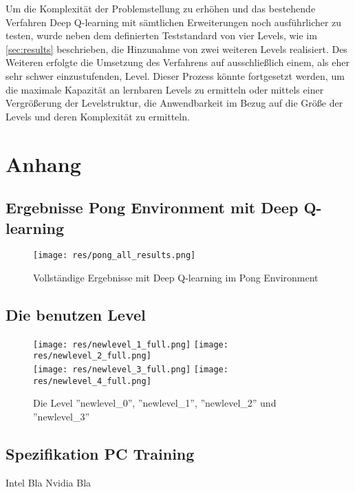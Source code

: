 \documentclass[11pt]{scrartcl}
\begin{document}
Um die Komplexität der Problemstellung zu erhöhen und das bestehende Verfahren Deep Q-learning mit
sämtlichen Erweiterungen noch ausführlicher zu testen, wurde neben dem definierten Teststandard von
vier Levels, wie im \autoref{sec:results} beschrieben, die Hinzunahme von zwei weiteren Levels
realisiert. Des Weiteren erfolgte die Umsetzung des Verfahrens auf ausschließlich einem, als eher
sehr schwer einzustufenden, Level. Dieser Prozess könnte fortgesetzt werden, um die maximale
Kapazität an lernbaren Levels zu ermitteln oder mittels einer Vergrößerung der Levelstruktur, die
Anwendbarkeit im Bezug auf die Größe der Levels und deren Komplexität zu ermitteln.


\newpage
%


\newpage
\listoffigures 
\listoftables 

\newpage
\section{Anhang}

\subsection{Ergebnisse Pong Environment mit Deep Q-learning}
\begin{figure}[htp]
\centering
\texttt{[image: res/pong\_all\_results.png]}
\caption{Vollständige Ergebnisse mit Deep Q-learning im Pong Environment}
\label{fig:pong_all_results}
\end{figure}

\subsection{Die benutzen Level}
\label{sec:levels}
\begin{figure}[htp]
\centering
\texttt{[image: res/newlevel\_1\_full.png]}
\texttt{[image: res/newlevel\_2\_full.png]}
\newline
\hspace{10pt}\\
\texttt{[image: res/newlevel\_3\_full.png]}
\texttt{[image: res/newlevel\_4\_full.png]}

\caption{
  Die Level ''newlevel\_0'', ''newlevel\_1'',
            ''newlevel\_2'' und ''newlevel\_3''
        }
\end{figure}

\subsection{Spezifikation PC Training}
\label{sec:specs}
Intel Bla
Nvidia Bla
\end{document}
